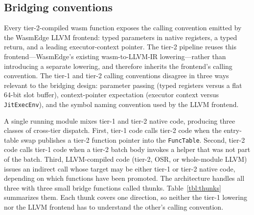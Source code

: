\subsection{Bridging conventions}
\label{sec:design:tier2:thunks}

Every tier-2-compiled wasm function exposes the calling convention emitted by the WasmEdge LLVM frontend: typed parameters in native registers, a typed return, and a leading executor-context pointer. The tier-2 pipeline reuses this frontend---WasmEdge's existing wasm-to-LLVM-IR lowering---rather than introducing a separate lowering, and therefore inherits the frontend's calling convention. The tier-1 and tier-2 calling conventions disagree in three ways relevant to the bridging design: parameter passing (typed registers versus a flat 64-bit slot buffer), context-pointer expectation (executor context versus \texttt{JitExecEnv}), and the symbol naming convention used by the LLVM frontend.

A single running module mixes tier-1 and tier-2 native code, producing three classes of cross-tier dispatch. First, tier-1 code calls tier-2 code when the entry-table swap publishes a tier-2 function pointer into the \texttt{FuncTable}. Second, tier-2 code calls tier-1 code when a tier-2 batch body invokes a helper that was not part of the batch. Third, LLVM-compiled code (tier-2, OSR, or whole-module LLVM) issues an indirect call whose target may be either tier-1 or tier-2 native code, depending on which functions have been promoted. The architecture handles all three with three small bridge functions called thunks. Table~\ref{tbl:thunks} summarizes them. Each thunk covers one direction, so neither the tier-1 lowering nor the LLVM frontend has to understand the other's calling convention.

